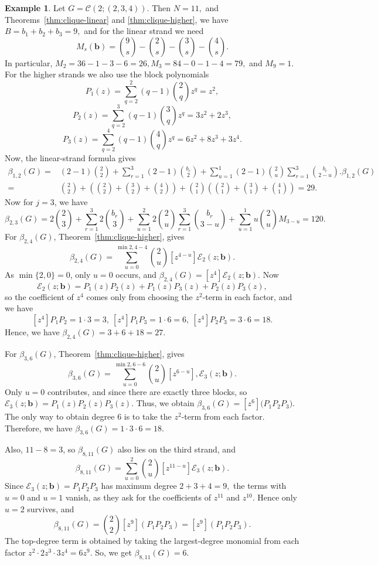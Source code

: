 \documentclass[12pt]{article}
\theoremstyle{definition}
\newtheorem{example}[theorem]{Example}
\theoremstyle{remark}
\newcommand{\EE}{\mathcal{E}}
\newcommand{\CC}{\mathcal{C}}
\newcommand{\bk}[1]{\mathbf{#1}}
\begin{document}
	
	\begin{example}\label{ex:clique-example}
		Let $G=\CC(2;(2,3,4))$. Then $N =11,$ and Theorems~\ref{thm:clique-linear} and \ref{thm:clique-higher}, we have  $
		B=b_1+b_2+b_3=9, $
		and for the linear strand we need
		$$
		M_s(\bk{b})=\binom{9}{s}-\binom{2}{s}-\binom{3}{s}-\binom{4}{s}.
		$$
		In particular, $
		M_2=36-1-3-6=26,
		M_3=84-0-1-4=79,$ and $
		M_9=1.
		$
		 For the higher strands we also use the block polynomials
		$$
		P_1(z)=\sum_{q=2}^{2}(q-1)\binom{2}{q}z^q=z^2,
		$$
		$$
		P_2(z)=\sum_{q=2}^{3}(q-1)\binom{3}{q}z^q=3z^2+2z^3,
		$$
		$$
		P_3(z)=\sum_{q=2}^{4}(q-1)\binom{4}{q}z^q=6z^2+8z^3+3z^4.
		$$
		Now, the linear-strand formula gives
		\begin{align*}
		 \beta_{1,2}(G)
		=& (2-1)\binom{2}{2}
		+
		\sum_{r=1}^3 (2-1)\binom{b_r}{2}
		+
		\sum_{u=1}^{1}(2-1)\binom{2}{u}\sum_{r=1}^3 \binom{b_r}{2-u}.
		\beta_{1,2}(G)\\
		=& \binom{2}{2}
		+
		\left(\binom{2}{2}+\binom{3}{2}+\binom{4}{2}\right)
		+
		\binom{2}{1}\left(\binom{2}{1}+\binom{3}{1}+\binom{4}{1}\right)=29.
		\end{align*}
		 Now for $j=3$, we have
		$$
		\beta_{2,3}(G)
		= 2\binom{2}{3}
		+
		\sum_{r=1}^3 2\binom{b_r}{3}
		+
		\sum_{u=1}^{2} 2\binom{2}{u}\sum_{r=1}^3 \binom{b_r}{3-u}
		+
		\sum_{u=1}^{1} u\binom{2}{u}M_{3-u}=120.
		$$
		 For  $\beta_{2,4}(G)$,  Theorem~\ref{thm:clique-higher}, gives
		$$
		\beta_{2,4}(G)=\sum_{u=0}^{\min{2,4-4}} \binom{2}{u}[z^{4-u}]\EE_2(z;\bk{b}).
		$$
		As $\min\{2,0\}=0$, only $u=0$ occurs, and 
		$ \beta_{2,4}(G)=[z^4]\EE_2(z;\bk{b}). $
		Now
		$$
		\EE_2(z;\bk{b})=P_1(z)P_2(z)+P_1(z)P_3(z)+P_2(z)P_3(z),
		$$
		so the coefficient of $z^4$ comes only from choosing the $z^2$-term in each factor, and we have
		$$
		[z^4]P_1P_2 = 1\cdot 3=3, ~
		[z^4]P_1P_3 = 1\cdot 6=6, ~
		[z^4]P_2P_3 = 3\cdot 6=18.
		$$
		Hence, we have
		$ \beta_{2,4}(G)=3+6+18=27. $
		
		\medskip
		\noindent
		For $\beta_{3,6}(G)$,  Theorem~\ref{thm:clique-higher}, gives
		$$
		\beta_{3,6}(G)=\sum_{u=0}^{\min{2,6-6}} \binom{2}{u}[z^{6-u}],\EE_3(z;\bk{b}).
		$$
		Only $u=0$ contributes, and since there are exactly three blocks, so
		$ \EE_3(z;\bk{b})=P_1(z)P_2(z)P_3(z). $
		Thus, we obtain
		$ \beta_{3,6}(G)=[z^6]\big(P_1P_2P_3\big). $ The only way to obtain degree $6$ is to take the $z^2$-term from each factor. Therefore, we have 
		$ \beta_{3,6}(G)=1\cdot 3\cdot 6=18. $
		
		Also, $11-8=3$, so $\beta_{8,11}(G)$ also lies on the third strand, and 
		$$
		\beta_{8,11}(G)=\sum_{u=0}^{2}\binom{2}{u}[z^{11-u}]\EE_3(z;\bk{b}).
		$$
		Since $\EE_3(z;\bk{b})=P_1P_2P_3$ has maximum degree
		$ 2+3+4=9, $
		the terms with $u=0$ and $u=1$ vanish, as they ask for the coefficients of $z^{11}$ and $z^{10}$. Hence only $u=2$ survives, and 
		$$
		\beta_{8,11}(G)=\binom{2}{2}[z^9](P_1P_2P_3)=[z^9](P_1P_2P_3).
		$$
		The top-degree term is obtained by taking the largest-degree monomial from each factor
		$ z^2\cdot 2z^3\cdot 3z^4=6z^9. $
		So, we get  $\beta_{8,11}(G)=6.$ 
		

\end{example}
\end{document}
